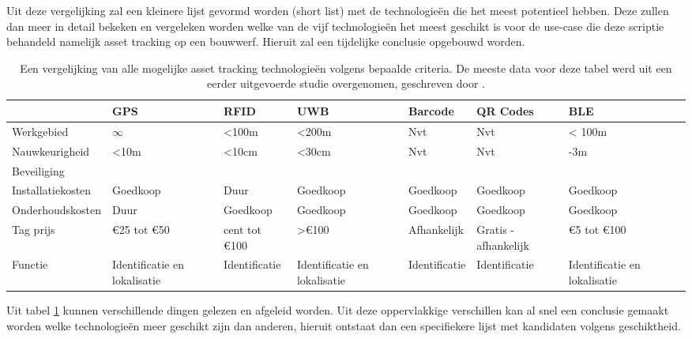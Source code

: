 Uit deze vergelijking zal een kleinere lijst gevormd worden (short list) met de technologieën die het meest potentieel hebben. Deze zullen dan meer in detail bekeken en vergeleken worden welke van de vijf technologieën het meest geschikt is voor de use-case die deze scriptie behandeld namelijk asset tracking op een bouwwerf. Hieruit zal een tijdelijke conclusie opgebouwd worden.\\

\begin{table}
\tiny
\begin{tabularx}{\textwidth} { 
        | >{\raggedright\arraybackslash}X 
        | >{\centering\arraybackslash}X 
        | >{\centering\arraybackslash}X 
        | >{\centering\arraybackslash}X 
        | >{\centering\arraybackslash}X 
        | >{\centering\arraybackslash}X 
        | >{\centering\arraybackslash}X 
        | >{\centering\arraybackslash}X | }
\hline
 & GPS & RFID & UWB & Barcode & QR Codes & BLE \\
\hline
Werkgebied & $\infty$ & <100m & <200m & Nvt & Nvt & < 100m\\
Nauwkeurigheid & <10m & <10cm & <30cm & Nvt & Nvt & 2-3m \\
Beveiliging & \\
Installatiekosten & Goedkoop & Duur & Goedkoop & Goedkoop & Goedkoop & Goedkoop \\
Onderhoudskosten & Duur & Goedkoop & Goedkoop & Goedkoop & Goedkoop & Goedkoop  \\
Tag prijs & \euro25 tot \euro50 & 50 cent tot \euro100 & >\euro100 & Afhankelijk & Gratis - afhankelijk & \euro5 tot \euro100 \\
Functie & Identificatie en lokalisatie & Identificatie & Identificatie en lokalisatie & Identificatie & Identificatie & Identificatie en lokalisatie \\
\hline
\end{tabularx}
\caption{Een vergelijking van alle mogelijke asset tracking technologieën volgens bepaalde criteria. De meeste data voor deze tabel werd uit een eerder uitgevoerde studie overgenomen, geschreven door \textcite{Ahmed2020}.}
\label{tab:technologies}
\end{table}

Uit tabel \ref{tab:technologies} kunnen verschillende dingen gelezen en afgeleid worden. Uit deze oppervlakkige verschillen kan al snel een conclusie gemaakt worden welke technologieën meer geschikt zijn dan anderen, hieruit ontstaat dan een specifiekere lijst met kandidaten volgens geschiktheid. \\

